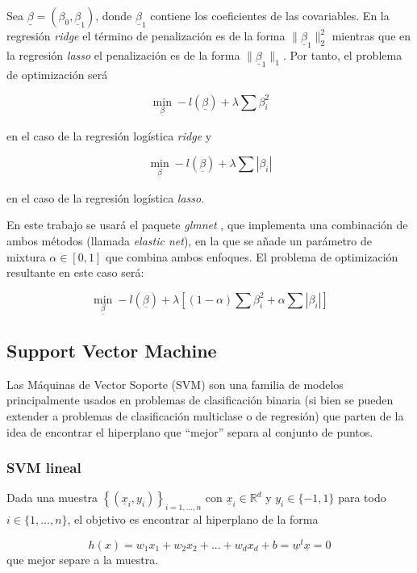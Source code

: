 \documentclass[12pt,a4paper,]{book}
\numberwithin{dummy}{section}
\theoremstyle{ocrenumbox}
\theoremstyle{blacknumex}
\theoremstyle{blacknumbox}
\theoremstyle{ocrenum}
\theoremstyle{ocrenum}
\begin{document}
Sea \(\underline \beta = \left( \beta_0, \underline \beta_1 \right)\),
donde \(\underline \beta_1\) contiene los coeficientes de las
covariables. En la regresión \emph{ridge} el término de penalización es
de la forma \(\| \underline \beta_1 \|^2_2\) mientras que en la
regresión \emph{lasso} el penalización es de la forma
\(\| \underline \beta_1 \|_1\). Por tanto, el problema de optimización
será

\[\min_{\underline \beta} -l(\underline \beta)  + \lambda \sum \beta_i^2 \]

en el caso de la regresión logística \emph{ridge} y

\[\min_{\underline \beta} -l(\underline \beta)  + \lambda \sum |\beta_i|\]

en el caso de la regresión logística \emph{lasso}.

En este trabajo se usará el paquete \emph{glmnet} \citep{glmnetpackage},
que implementa una combinación de ambos métodos (llamada \emph{elastic
net}), en la que se añade un parámetro de mixtura
\(\alpha \in \left[0,1\right]\) que combina ambos enfoques. El problema
de optimización resultante en este caso será:

\[\min_{\underline \beta} -l(\underline \beta)  + \lambda \left[(1-\alpha)\sum \beta_i^2 + \alpha \sum |\beta_i| \right]\]

\hypertarget{support-vector-machine}{%
\subsection{Support Vector Machine}\label{support-vector-machine}}

Las Máquinas de Vector Soporte (SVM) son una familia de modelos
principalmente usados en problemas de clasificación binaria (si bien se
pueden extender a problemas de clasificación multiclase o de regresión)
que parten de la idea de encontrar el hiperplano que ``mejor'' separa al
conjunto de puntos.

\hypertarget{svm-lineal}{%
\subsubsection{SVM lineal}\label{svm-lineal}}

Dada una muestra \(\left\{(\underline x_i,y_i) \right\}_{i=1,...,n}\)
con \(\underline x_i \in \mathbb{R}^d\) y \(y_i \in \{-1,1\}\) para todo
\(i \in \{1,...,n\}\), el objetivo es encontrar al hiperplano de la
forma

\[h(x) = w_1x_1 +w_2x_2+...+w_dx_d +b = \underline w^t \underline x = 0 \]
que mejor separe a la muestra.
\end{document}

